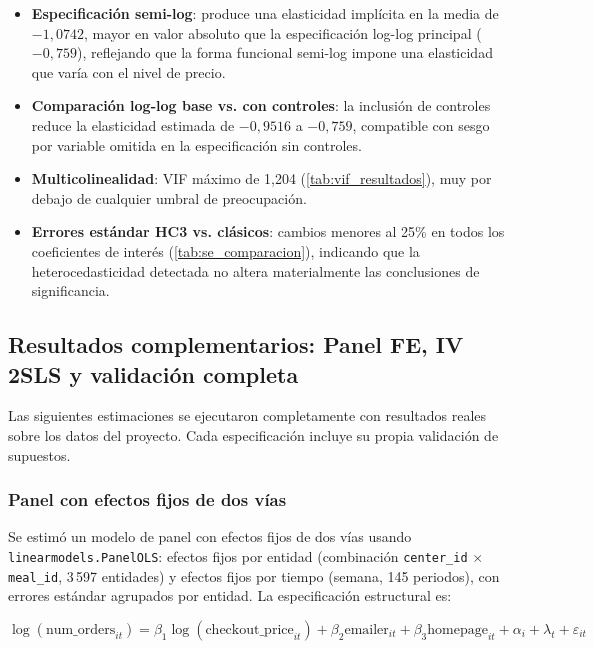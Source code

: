 \documentclass[doc, a4paper, biblatex, floatsintext, longtable, babel]{apa7}
\begin{document}
\begin{itemize}
    \item \textbf{Especificaci\'on semi-log}: produce una elasticidad impl\'icita en la media de $-1,0742$, mayor en valor absoluto que la especificaci\'on log-log principal ($-0,759$), reflejando que la forma funcional semi-log impone una elasticidad que var\'ia con el nivel de precio.
    \item \textbf{Comparaci\'on log-log base vs. con controles}: la inclusi\'on de controles reduce la elasticidad estimada de $-0,9516$ a $-0,759$, compatible con sesgo por variable omitida en la especificaci\'on sin controles.
    \item \textbf{Multicolinealidad}: VIF m\'aximo de 1,204 (\cref{tab:vif_resultados}), muy por debajo de cualquier umbral de preocupaci\'on.
    \item \textbf{Errores est\'andar HC3 vs. cl\'asicos}: cambios menores al 25\% en todos los coeficientes de inter\'es (\cref{tab:se_comparacion}), indicando que la heterocedasticidad detectada no altera materialmente las conclusiones de significancia.
\end{itemize}

\subsection{Resultados complementarios: Panel FE, IV 2SLS y validaci\'on completa}
\label{subsec:resultados_complementarios}

Las siguientes estimaciones se ejecutaron completamente con resultados reales sobre los datos del proyecto. Cada especificación incluye su propia validación de supuestos.

\subsubsection{Panel con efectos fijos de dos v\'ias}
\label{subsec:panel_fe}

Se estim\'o un modelo de panel con efectos fijos de dos v\'ias usando \texttt{linearmodels.PanelOLS}: efectos fijos por entidad (combinaci\'on \texttt{center\_id} $\times$ \texttt{meal\_id}, 3\,597 entidades) y efectos fijos por tiempo (semana, 145 periodos), con errores est\'andar agrupados por entidad. La especificaci\'on estructural es:

\begin{equation}
\log(\text{num\_orders}_{it}) = \beta_1 \log(\text{checkout\_price}_{it}) + \beta_2 \text{emailer}_{it} + \beta_3 \text{homepage}_{it} + \alpha_i + \lambda_t + \varepsilon_{it}
\end{equation}
\end{document}
